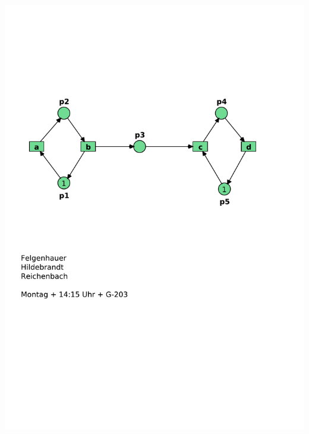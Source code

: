 \documentclass[12pt,a4paper]{../krautsourcing/homework}
\begin{document}
\subsection{}
\includegraphics[scale=0.5,trim={15mm 150mm 20mm 60mm},clip]{Aufgabe_6-4/Aufgabe_6-4-1.pdf}

\newpage
\end{document}
